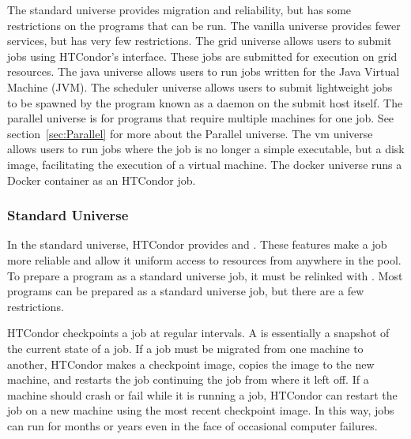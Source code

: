 The standard universe provides migration and reliability, but has some
restrictions on the programs that can be run. 
The vanilla universe provides fewer services, but has very few
restrictions.
The grid universe allows users to submit 
jobs using HTCondor's interface.
These jobs are submitted for execution on grid resources.
The java universe allows users to run jobs written for the
Java Virtual Machine (JVM).
The scheduler universe allows users to submit lightweight jobs
to be spawned by the program known as a daemon on the submit host itself.
The parallel universe is for programs that require multiple machines
for one job.
See section~\ref{sec:Parallel} for more about the Parallel universe.
The vm universe allows users to run jobs where the job is
no longer a simple executable, but a disk image, facilitating
the execution of a virtual machine.
The docker universe runs a Docker container as an HTCondor job.

\subsubsection{\label{sec:standard-universe}Standard Universe}

In the standard universe, HTCondor provides  and
.  These features make a job more reliable
and allow it uniform access to resources from anywhere in the pool.
To prepare a program as a standard universe job, it must be relinked
with .  Most programs can be prepared as a standard
universe job, but there are a few restrictions.

HTCondor checkpoints a job at regular intervals.
A  is essentially a snapshot of the current
state of a job. 
If a job must be migrated from one machine to another,
HTCondor makes a checkpoint image, copies the image to the new machine,
and restarts the job continuing the job from where it left off.
If a machine should
crash or fail while it is running a job, HTCondor can restart the job on
a new machine using the most recent checkpoint image.
In this way, jobs
can run for months or years even in the face of occasional computer failures.

